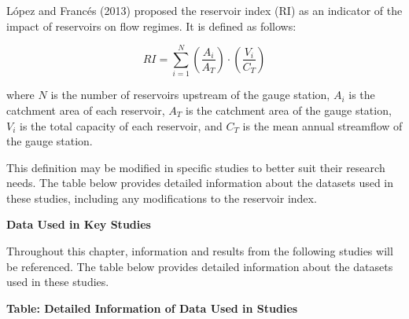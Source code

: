 \documentclass[
]{krantz}
\begin{document}
López and Francés (2013) proposed the reservoir index (RI) as an indicator of the impact of reservoirs on flow regimes. It is defined as follows:

\[ RI = \sum_{i=1}^{N}\left(\frac{A_{i}}{A_{T}}\right) \cdot \left(\frac{V_{i}}{C_{T}}\right) \tag{1}\]

where \(N\) is the number of reservoirs upstream of the gauge station, \(A_{i}\) is the catchment area of each reservoir, \(A_{T}\) is the catchment area of the gauge station, \(V_{i}\) is the total capacity of each reservoir, and \(C_{T}\) is the mean annual streamflow of the gauge station.

This definition may be modified in specific studies to better suit their research needs. The table below provides detailed information about the datasets used in these studies, including any modifications to the reservoir index.

\textbf{Data Used in Key Studies}

Throughout this chapter, information and results from the following studies will be referenced. The table below provides detailed information about the datasets used in these studies.

\textbf{Table: Detailed Information of Data Used in Studies}
\end{document}
